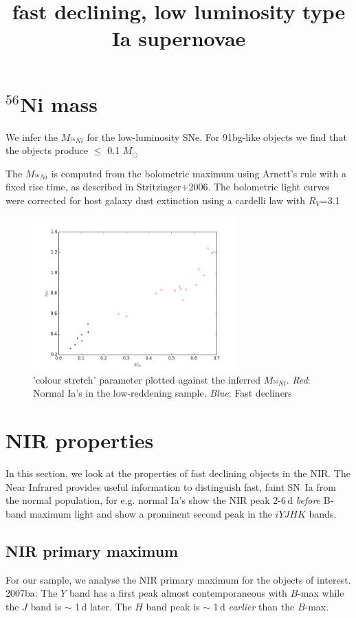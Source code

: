 \documentclass{article}
\newcommand{\Nif}{$^{56}$Ni }
\begin{document}
\title{fast declining, low luminosity type Ia supernovae}
\maketitle

\section{\Nif mass}
We infer the $M_{^{56}Ni}$ for the low-luminosity SNe. For 91bg-like objects we find that the objects produce $\leq$ 0.1 $M_{\odot}$

The $M_{^{56}Ni}$ is computed from the bolometric maximum using Arnett's rule with a fixed rise time, as described in Stritzinger+2006. The bolometric light curves were corrected for host galaxy dust extinction using a cardelli law with $R_V$=3.1



\begin{figure}
\includegraphics[width=0.7\textwidth]{../../diag_plots/sbv_mni_fast_norm.png}
\caption{'colour stretch' parameter plotted against the inferred $M_{^{56}Ni}$. \emph{Red}: Normal Ia's in the low-reddening sample. \emph{Blue}: Fast decliners}
\end{figure}

\section{NIR properties}
In this section, we look at the properties of fast declining objects in the NIR. The Near Infrared provides useful information to distinguish fast, faint SN~Ia from the normal  population, for e.g. normal Ia's show the NIR peak 2-6\,d \emph{before} B-band maximum light and show a prominent second peak in the $iYJHK$ bands.

\subsection{NIR primary maximum}
For our sample, we analyse the NIR primary maximum for the objects of interest. 
2007ba:
The $Y$ band has a first peak almost contemporaneous with $B$-max while the $J$ band is $\sim$ 1\,d later. The $H$ band peak is $\sim$ 1\,d \emph{earlier} than the $B$-max. 
\end{document}
